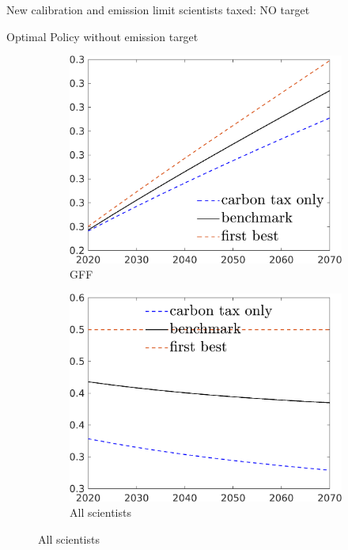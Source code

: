 \documentclass[11pt,aspectratio=169]{beamer}
\begin{document}
\begin{frame}{New calibration and emission limit scientists taxed: NO target}
\begin{figure}[h!!]
\begin{subfigure}{0.4\textwidth}
		\end{subfigure}
	\end{figure}
\end{frame}


\begin{frame}{Optimal Policy without emission target}
	\begin{figure}[h!!]
		\centering
		\begin{subfigure}{0.3\textwidth}		
			\caption{{GFF}}
			\includegraphics[width=1\textwidth]{../codding_model/own_basedOnFried/optimalPol_010922_revision/figures/all_13Sept22/NewCalib_eff2pol_NoT_GFF_Sun2_emnet1_spillover0_knspil3_xgr0_nsk0_sep0_extern0_PV1_etaa0.79_lgd1.png}
		\end{subfigure}
		\begin{subfigure}{0.3\textwidth}		
			\caption{{All scientists}}
			\includegraphics[width=1\textwidth]{../codding_model/own_basedOnFried/optimalPol_010922_revision/figures/all_13Sept22/NewCalib_eff2pol_NoT_S_Sun2_emnet1_spillover0_knspil3_xgr0_nsk0_sep0_extern0_PV1_etaa0.79_lgd1.png}

\end{subfigure}
\end{figure}
\end{frame}
\end{document}
